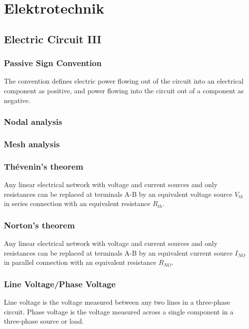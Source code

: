 \section{Elektrotechnik}
\subsection{Electric Circuit III}

\subsubsection{Passive Sign Convention}
The convention defines electric power flowing out of the circuit into an electrical component as positive, and power flowing into the circuit out of a component as negative.

\subsubsection{Nodal analysis}

\subsubsection{Mesh analysis}

\subsubsection{Thévenin's theorem}

Any linear electrical network with voltage and current sources and only resistances can be replaced at terminals A-B by an equivalent voltage source $V_{th}$ in series connection with an equivalent resistance $R_{th}$.

\subsubsection{Norton's theorem}

Any linear electrical network with voltage and current sources and only resistances can be replaced at terminals A-B by an equivalent current source $I_{NO}$ in parallel connection with an equivalent resistance $R_{NO}$.

\subsubsection{Line Voltage/Phase Voltage}

Line voltage is the voltage measured between any two lines in a three-phase circuit. Phase voltage is the voltage measured across a single component in a three-phase source or load.

